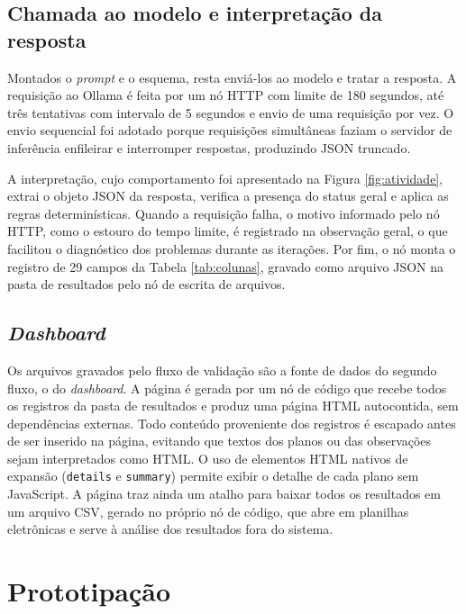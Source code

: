 \subsection{Chamada ao modelo e interpretação da resposta}

Montados o \textit{prompt} e o esquema, resta enviá-los ao modelo e tratar a resposta. A requisição ao Ollama é feita por um nó HTTP com limite de 180 segundos, até três tentativas com intervalo de 5 segundos e envio de uma requisição por vez. O envio sequencial foi adotado porque requisições simultâneas faziam o servidor de inferência enfileirar e interromper respostas, produzindo JSON truncado.

A interpretação, cujo comportamento foi apresentado na Figura \ref{fig:atividade}, extrai o objeto JSON da resposta, verifica a presença do status geral e aplica as regras determinísticas. Quando a requisição falha, o motivo informado pelo nó HTTP, como o estouro do tempo limite, é registrado na observação geral, o que facilitou o diagnóstico dos problemas durante as iterações. Por fim, o nó monta o registro de 29 campos da Tabela \ref{tab:colunas}, gravado como arquivo JSON na pasta de resultados pelo nó de escrita de arquivos.

\subsection{\textit{Dashboard}}

Os arquivos gravados pelo fluxo de validação são a fonte de dados do segundo fluxo, o do \textit{dashboard}. A página é gerada por um nó de código que recebe todos os registros da pasta de resultados e produz uma página HTML autocontida, sem dependências externas. Todo conteúdo proveniente dos registros é escapado antes de ser inserido na página, evitando que textos dos planos ou das observações sejam interpretados como HTML. O uso de elementos HTML nativos de expansão (\texttt{details} e \texttt{summary}) permite exibir o detalhe de cada plano sem JavaScript. A página traz ainda um atalho para baixar todos os resultados em um arquivo CSV, gerado no próprio nó de código, que abre em planilhas eletrônicas e serve à análise dos resultados fora do sistema.

\section{Prototipação}
\label{sec:prototipo}

